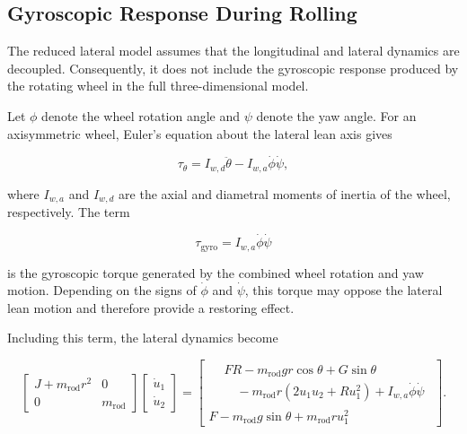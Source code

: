 \subsection{Gyroscopic Response During Rolling}

The reduced lateral model assumes that the longitudinal and lateral dynamics are decoupled. Consequently, it does not include the gyroscopic response produced by the rotating wheel in the full three-dimensional model.

Let $\phi$ denote the wheel rotation angle and $\psi$ denote the yaw angle. For an axisymmetric wheel, Euler's equation about the lateral lean axis gives

\begin{equation}
\tau_{\theta}
=
I_{w,d}\ddot{\theta}
-
I_{w,a}\dot{\phi}\dot{\psi},
\label{eq:wheel-euler-equation}
\end{equation}

where $I_{w,a}$ and $I_{w,d}$ are the axial and diametral moments of inertia of the wheel, respectively. The term

\begin{equation}
\tau_{\mathrm{gyro}}
=
I_{w,a}\dot{\phi}\dot{\psi}
\label{eq:gyroscopic-torque}
\end{equation}

is the gyroscopic torque generated by the combined wheel rotation and yaw motion. Depending on the signs of $\dot{\phi}$ and $\dot{\psi}$, this torque may oppose the lateral lean motion and therefore provide a restoring effect.

Including this term, the lateral dynamics become

\begin{equation}
\begin{bmatrix}
J+m_{\mathrm{rod}}r^2 & 0 \\
0 & m_{\mathrm{rod}}
\end{bmatrix}
\begin{bmatrix}
\dot{u}_1 \\
\dot{u}_2
\end{bmatrix}
=
\begin{bmatrix}
\begin{aligned}
&FR
-m_{\mathrm{rod}}gr\cos\theta
+G\sin\theta \\
&\quad
-m_{\mathrm{rod}}r
\left(
2u_1u_2+Ru_1^2
\right)
+I_{w,a}\dot{\phi}\dot{\psi}
\end{aligned}
\\[8pt]
F
-m_{\mathrm{rod}}g\sin\theta
+m_{\mathrm{rod}}ru_1^2
\end{bmatrix}.
\label{eq:lateral-model-with-gyroscopic-torque}
\end{equation}

